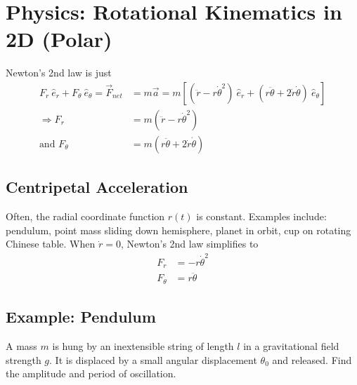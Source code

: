 \documentclass{article}
\begin{document}
\section{Physics: Rotational Kinematics in 2D (Polar)}
Newton's 2nd law is just
\begin{align}
    F_r\ \hat{e}_r + F_\theta\ \hat{e}_\theta = \vec{F}_{net} & = m \vec{a} = m \left[(\ddot{r} - r{\dot\theta}^2)\ \hat{e}_r + (r\ddot\theta + 2\dot r \dot \theta)\ \hat{e}_\theta \right]\\
    \Rightarrow F_r &= m(\ddot r - r{\dot\theta}^2) \\ 
    \text{and } F_\theta &= m (r\ddot\theta + 2 \dot r \dot \theta)  
\end{align}
\subsection{Centripetal Acceleration}
Often, the radial coordinate function $r(t)$ is constant. Examples include: pendulum, point mass sliding down hemisphere, planet in orbit, cup on rotating Chinese table. When $\dot r = 0$, Newton's 2nd law simplifies to
\begin{align}
    F_r &= -r {\dot\theta}^2 \\
    F_\theta &= r\ddot\theta
\end{align}

\subsection{Example: Pendulum}
A mass $m$ is hung by an inextensible string of length $l$ in a gravitational field strength $g$. It is displaced by a small angular displacement $\theta_0$ and released. Find the amplitude and period of oscillation.
\end{document}
